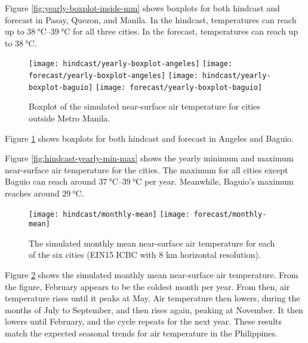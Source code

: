 	Figure \ref{fig:yearly-boxplot-inside-mm} shows boxplots for both hindcast and forecast in Pasay, Quezon, and Manila.
	In the hindcast, temperatures can reach up to $\qtyrange{38}{39}{\degreeCelsius}$ for all three cities.
	In the forecast, temperatures can reach up to $\qty{38}{\degreeCelsius}$.

	\begin{figure}	
		\centering
		\texttt{[image: hindcast/yearly-boxplot-angeles]}
		\texttt{[image: forecast/yearly-boxplot-angeles]}
		\texttt{[image: hindcast/yearly-boxplot-baguio]}
		\texttt{[image: forecast/yearly-boxplot-baguio]}		
		\caption{
			Boxplot of the simulated near-surface air temperature for cities outside Metro Manila.
		}
		\label{fig:yearly-boxplot-outside-mm}
	\end{figure}

	Figure \ref{fig:yearly-boxplot-outside-mm} shows boxplots for both hindcast and forecast in Angeles and Baguio.
 

	Figure \ref{fig:hindcast-yearly-min-max} shows the yearly minimum and maximum near-surface air temperature for the cities.
	The maximum for all cities except Baguio can reach around $\qtyrange{37}{39}{\degreeCelsius}$ per year.
	Meanwhile, Baguio's maximum reaches around $\qty{29}{\degreeCelsius}$. 
		
	\begin{figure}	
		\centering
		\texttt{[image: hindcast/monthly-mean]}
		\texttt{[image: forecast/monthly-mean]}
		\caption{
			The simulated monthly mean near-surface air temperature for each of the six cities (EIN15 ICBC with 8 km horizontal resolution).
		}
		\label{fig:hindcast-monthly-mean}
	\end{figure}

	Figure \ref{fig:hindcast-monthly-mean} shows the simulated monthly mean near-surface air temperature.
	From the figure, February appears to be the coldest month per year.
	From then, air temperature rises until it peaks at May.
	Air temperature then lowers, during the months of July to September,
		and then rises again, peaking at November.
	It then lowers until February, and the cycle repeats for the next year.
	These results match the expected seasonal trends for air temperature in the Philippines.
	

